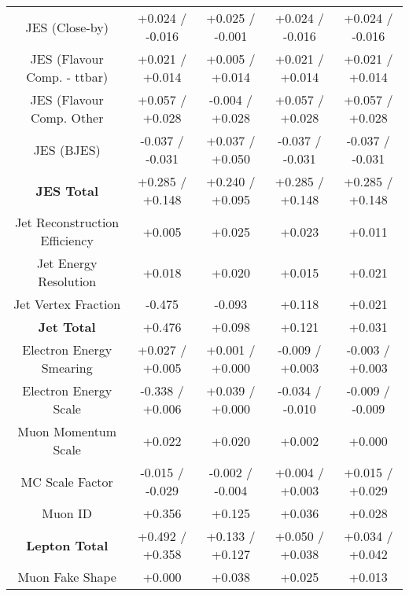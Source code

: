 \begin{table}[htbp]
\begin{center}
\begin{tabular}{|c|c|c|c|c|}
JES (Close-by)                        &+0.024   / -0.016   & +0.025   / -0.001   & +0.024   / -0.016   & +0.024   / -0.016  \\
JES (Flavour Comp. - ttbar)           &+0.021   / +0.014   & +0.005   / +0.014   & +0.021   / +0.014   & +0.021   / +0.014  \\
JES (Flavour Comp. Other              &+0.057   / +0.028   & -0.004   / +0.028   & +0.057   / +0.028   & +0.057   / +0.028  \\
JES (BJES)                            &-0.037   / -0.031   & +0.037   / +0.050   & -0.037   / -0.031   & -0.037   / -0.031  \\
\hline
\textbf{JES Total}                    &+0.285   / +0.148   & +0.240   / +0.095   & +0.285   / +0.148   & +0.285   / +0.148  \\
\hline
Jet Reconstruction Efficiency         &+0.005              & +0.025              & +0.023              & +0.011             \\
Jet Energy Resolution                 &+0.018              & +0.020              & +0.015              & +0.021             \\
Jet Vertex Fraction                   &-0.475              & -0.093              & +0.118              & +0.021             \\
\hline
\textbf{Jet Total}                    &+0.476              & +0.098              & +0.121              & +0.031             \\
\hline
Electron Energy Smearing              &+0.027   / +0.005   & +0.001   / +0.000   & -0.009   / +0.003   & -0.003   / +0.003  \\
Electron Energy Scale                 &-0.338   / +0.006   & +0.039   / +0.000   & -0.034   / -0.010   & -0.009   / -0.009  \\
Muon Momentum Scale                   &+0.022              & +0.020              & +0.002              & +0.000             \\
MC Scale Factor                       &-0.015   / -0.029   & -0.002   / -0.004   & +0.004   / +0.003   & +0.015   / +0.029  \\
Muon ID                               &+0.356              & +0.125              & +0.036              & +0.028             \\
\hline
\textbf{Lepton Total}                 &+0.492   / +0.358   & +0.133   / +0.127   & +0.050   / +0.038   & +0.034   / +0.042  \\
\hline
Muon Fake Shape                       &+0.000              & +0.038              & +0.025              & +0.013             \\

\end{tabular}
\end{center}
\end{table}
